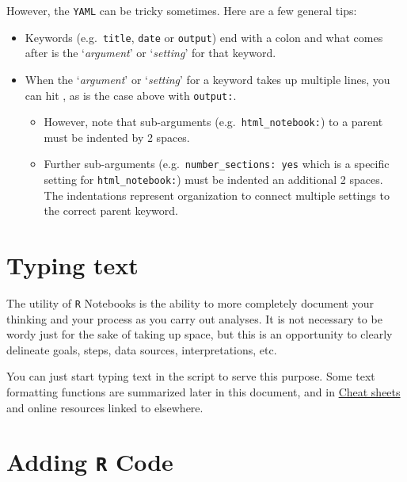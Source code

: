\documentclass[
]{book}
\providecommand{\tightlist}{%
  \setlength{\itemsep}{0pt}\setlength{\parskip}{0pt}}
\begin{document}
However, the \texttt{YAML} can be tricky sometimes. Here are a few general tips:

\begin{itemize}
\tightlist
\item
  Keywords (e.g.~\texttt{title}, \texttt{date} or \texttt{output}) end with a colon and what comes after is the `\emph{argument}' or `\emph{setting}' for that keyword.\\
\item
  When the `\emph{argument}' or `\emph{setting}' for a keyword takes up multiple lines, you can hit \emph{}, as is the case above with \texttt{output:}.

  \begin{itemize}
  \tightlist
  \item
    However, note that sub-arguments (e.g.~\texttt{html\_notebook:}) to a parent must be indented by 2 spaces.
  \item
    Further sub-arguments (e.g.~\texttt{number\_sections:\ yes} which is a specific setting for \texttt{html\_notebook:}) must be indented an additional 2 spaces. The indentations represent organization to connect multiple settings to the correct parent keyword.
  \end{itemize}
\end{itemize}

\hypertarget{typing-text}{%
\section{Typing text}\label{typing-text}}

The utility of \texttt{R} Notebooks is the ability to more completely document your thinking and your process as you carry out analyses. It is not necessary to be wordy just for the sake of taking up space, but this is an opportunity to clearly delineate goals, steps, data sources, interpretations, etc.

You can just start typing text in the script to serve this purpose. Some text formatting functions are summarized later in this document, and in \href{https://github.com/rstudio/cheatsheets/raw/master/rmarkdown.pdf}{Cheat sheets} and online resources linked to elsewhere.

\hypertarget{adding-r-code}{%
\section{\texorpdfstring{Adding \texttt{R} Code}{Adding R Code}}\label{adding-r-code}}
\end{document}

